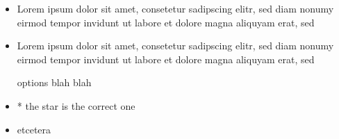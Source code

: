 \documentclass{article}
\begin{document}
\begin{itemize}
  \item Lorem ipsum dolor sit amet, consetetur sadipscing elitr, sed diam
    nonumy eirmod tempor invidunt ut labore et dolore magna aliquyam erat, sed
  \item Lorem ipsum dolor sit amet, consetetur sadipscing elitr, sed diam
    nonumy eirmod tempor invidunt ut labore et dolore magna aliquyam erat, sed
\end{itemize}

\begin{itemize}
  something here

  \item [options] blah blah
  \item * the star is the correct one
  \item etcetera
\end{itemize}
\end{document}
